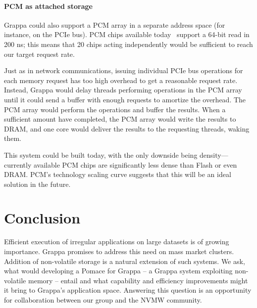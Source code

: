 \paragraph{PCM as attached storage}

Grappa could also support a PCM array in a separate address space (for
instance, on the PCIe bus). PCM chips available today~\cite{micronPCM} support a
64-bit read in 200 ns; this means that 20 chips acting independently
would be sufficient to reach our target request rate.

Just as in network communications, issuing individual PCIe bus
operations for each memory request has too high overhead to get a
reasonable request rate.  Instead, Grappa would delay threads
performing operations in the PCM array until it could send a buffer
with enough requests to amortize the overhead. The PCM array would
perform the operations and buffer the results. When a sufficient
amount have completed, the PCM array would write the results to DRAM,
and one core would deliver the results to the requesting threads,
waking them.


This system could be built today, with the only downside being
density---currently available PCM chips are significantly less dense
than Flash or even DRAM. PCM's technology scaling curve suggests that
this will be an ideal solution in the future.

\section{Conclusion}
Efficient execution of irregular applications on large datasets is of
growing importance.  Grappa promises to address this need on mass
market clusters.  Addition of non-volatile storage is a natural
extension of such systems.  We ask, what would developing a Pomace for
Grappa -- a Grappa system exploiting non-volatile memory -- entail and
what capability and efficiency improvements might it bring to Grappa's
application space.  Answering this question is an opportunity for
collaboration between our group and the NVMW community.











